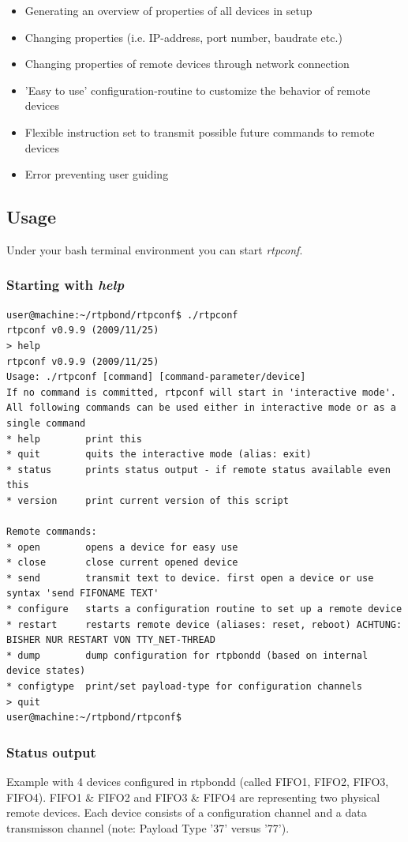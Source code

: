 \documentclass[a4paper]{book}%
\begin{document}
\begin{itemize}
\item Generating an overview of properties of all devices in setup
\item Changing properties (i.e. IP-address, port number, baudrate etc.)
\item Changing properties of remote devices through network connection
\item 'Easy to use' configuration-routine to customize the behavior of remote devices
\item Flexible instruction set to transmit possible future commands to remote devices
\item Error preventing user guiding
\end{itemize}

\subsection{Usage}
Under your bash terminal environment you can start \emph{rtpconf}.
\subsubsection{Starting with \emph{help}}
\begin{verbatim}
user@machine:~/rtpbond/rtpconf$ ./rtpconf
rtpconf v0.9.9 (2009/11/25)
> help
rtpconf v0.9.9 (2009/11/25)
Usage: ./rtpconf [command] [command-parameter/device]
If no command is committed, rtpconf will start in 'interactive mode'. All following commands can be used either in interactive mode or as a single command
* help        print this
* quit        quits the interactive mode (alias: exit)
* status      prints status output - if remote status available even this
* version     print current version of this script

Remote commands:
* open        opens a device for easy use
* close       close current opened device
* send        transmit text to device. first open a device or use syntax 'send FIFONAME TEXT'
* configure   starts a configuration routine to set up a remote device
* restart     restarts remote device (aliases: reset, reboot) ACHTUNG: BISHER NUR RESTART VON TTY_NET-THREAD
* dump        dump configuration for rtpbondd (based on internal device states)
* configtype  print/set payload-type for configuration channels
> quit
user@machine:~/rtpbond/rtpconf$
\end{verbatim}

\subsubsection{Status output}
Example with 4 devices configured in rtpbondd (called FIFO1, FIFO2, FIFO3, FIFO4). FIFO1 \& FIFO2 and FIFO3 \& FIFO4 are representing two physical remote devices. Each device consists of a configuration channel and a data transmisson channel (note: Payload Type '37' versus '77').
\end{document}
